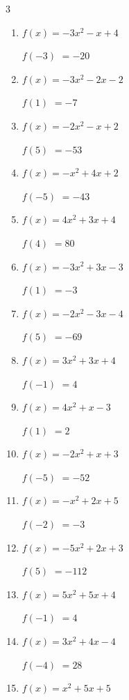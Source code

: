 \begin{multicols}{3}
\begin{enumerate}
$f(3)$
        $= -5$

\columnbreak %

  \item $f(x)=-3x^{2}-x+4$

$f(-3)$
        $= -20$

  \item $f(x)=-3x^{2}-2x-2$

$f(1)$
        $= -7$

  \item $f(x)=-2x^{2}-x+2$

$f(5)$
        $= -53$

  \item $f(x)=-x^{2}+4x+2$

$f(-5)$
        $= -43$

  \item $f(x)=4x^{2}+3x+4$

$f(4)$
        $= 80$

  \item $f(x)=-3x^{2}+3x-3$

$f(1)$
        $= -3$

  \item $f(x)=-2x^{2}-3x-4$

$f(5)$
        $= -69$

  \item $f(x)=3x^{2}+3x+4$

$f(-1)$
        $= 4$

  \item $f(x)=4x^{2}+x-3$

$f(1)$
        $= 2$

  \item $f(x)=-2x^{2}+x+3$

$f(-5)$
        $= -52$

  \item $f(x)=-x^{2}+2x+5$

$f(-2)$
        $= -3$

  \item $f(x)=-5x^{2}+2x+3$

$f(5)$
        $= -112$

  \item $f(x)=5x^{2}+5x+4$

$f(-1)$
        $= 4$

  \item $f(x)=3x^{2}+4x-4$

$f(-4)$
        $= 28$

  \item $f(x)=x^{2}+5x+5$


\end{enumerate}
\end{multicols}
